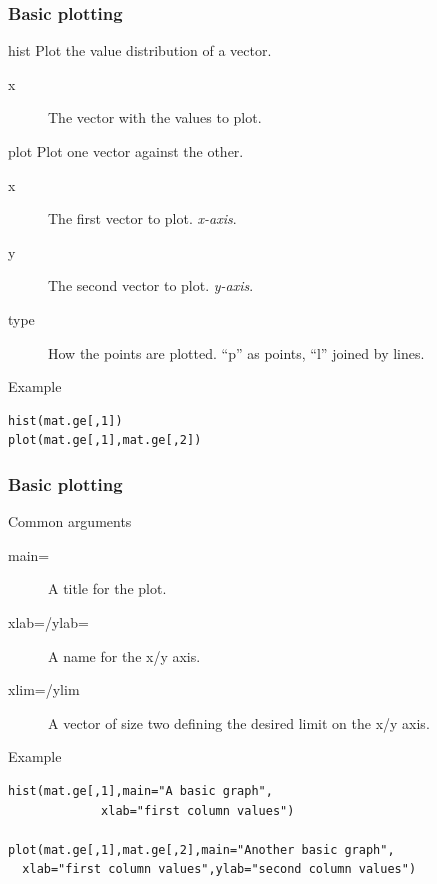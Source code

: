 \documentclass[10pt]{beamer}
\newenvironment{xframe}[2][]
  {\begin{frame}[fragile,environment=xframe,#1]
  \frametitle{#2}}
  {\end{frame}}
\begin{document}
\begin{xframe}{Basic plotting}
  \begin{block}{{\sf hist}}
    Plot the value distribution of a vector.
    \begin{description}
    \item[x] The vector with the values to plot.
    \end{description}
  \end{block}
  \begin{block}{{\sf plot}}
    Plot one vector against the other.
    \begin{description}
      \item[x] The first vector to plot. {\it x-axis}. 
      \item[y] The second vector to plot. {\it y-axis}. 
      \item[type] How the points are plotted. ``p'' as points, ``l'' joined by lines.
    \end{description}
  \end{block}
  \begin{exampleblock}{Example}
\begin{verbatim}
hist(mat.ge[,1])
plot(mat.ge[,1],mat.ge[,2])
\end{verbatim}  
  \end{exampleblock}
\end{xframe}


\begin{xframe}{Basic plotting}
  \begin{block}{Common arguments}
    \begin{description}
    \item[main=] A title for the plot.
    \item[xlab=/ylab=] A name for the x/y axis.
    \item[xlim=/ylim] A vector of size two defining the desired limit on the x/y axis.
    \end{description}
  \end{block}
  \begin{exampleblock}{Example}
\begin{verbatim}
hist(mat.ge[,1],main="A basic graph",
             xlab="first column values")

plot(mat.ge[,1],mat.ge[,2],main="Another basic graph",
  xlab="first column values",ylab="second column values")
\end{verbatim}  
  \end{exampleblock}
\end{xframe}
\end{document}
